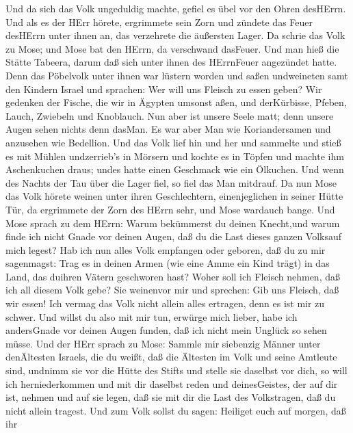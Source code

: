  Und da sich das Volk ungeduldig machte, gefiel es übel vor
den Ohren desHErrn. Und als es der HErr hörete, ergrimmete sein Zorn und
zündete das Feuer desHErrn unter ihnen an, das verzehrete die äußersten
Lager.  Da schrie das Volk zu Mose; und Mose bat den HErrn,
da verschwand dasFeuer.  Und man hieß die Stätte Tabeera,
darum daß sich unter ihnen des HErrnFeuer angezündet hatte. 
Denn das Pöbelvolk unter ihnen war lüstern worden und saßen undweineten
samt den Kindern Israel und sprachen: Wer will uns Fleisch zu essen
geben?  Wir gedenken der Fische, die wir in Ägypten umsonst
aßen, und derKürbisse, Pfeben, Lauch, Zwiebeln und Knoblauch.
 Nun aber ist unsere Seele matt; denn unsere Augen sehen
nichts denn dasMan.  Es war aber Man wie Koriandersamen und
anzusehen wie Bedellion.  Und das Volk lief hin und her und
sammelte und stieß es mit Mühlen undzerrieb's in Mörsern und kochte es
in Töpfen und machte ihm Aschenkuchen draus; undes hatte einen Geschmack
wie ein Ölkuchen.  Und wenn des Nachts der Tau über die
Lager fiel, so fiel das Man mitdrauf.  Da nun Mose das Volk
hörete weinen unter ihren Geschlechtern, einenjeglichen in seiner Hütte
Tür, da ergrimmete der Zorn des HErrn sehr, und Mose wardauch bange.
 Und Mose sprach zu dem HErrn: Warum bekümmerst du deinen
Knecht,und warum finde ich nicht Gnade vor deinen Augen, daß du die Last
dieses ganzen Volksauf mich legest?  Hab ich nun alles Volk
empfangen oder geboren, daß du zu mir sagenmagst: Trag es in deinen
Armen (wie eine Amme ein Kind trägt) in das Land, das duihren Vätern
geschworen hast?  Woher soll ich Fleisch nehmen, daß ich
all diesem Volk gebe? Sie weinenvor mir und sprechen: Gib uns Fleisch,
daß wir essen!  Ich vermag das Volk nicht allein alles
ertragen, denn es ist mir zu schwer.  Und willst du also
mit mir tun, erwürge mich lieber, habe ich andersGnade vor deinen Augen
funden, daß ich nicht mein Unglück so sehen müsse.  Und der
HErr sprach zu Mose: Sammle mir siebenzig Männer unter denÄltesten
Israels, die du weißt, daß die Ältesten im Volk und seine Amtleute sind,
undnimm sie vor die Hütte des Stifts und stelle sie daselbst vor dich,
 so will ich herniederkommen und mit dir daselbst reden und
deinesGeistes, der auf dir ist, nehmen und auf sie legen, daß sie mit
dir die Last des Volkstragen, daß du nicht allein tragest. 
Und zum Volk sollst du sagen: Heiliget euch auf morgen, daß ihr
